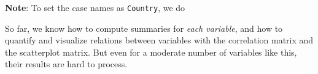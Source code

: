 \documentclass[]{book}
\newenvironment{Shaded}{\begin{snugshade}}{\end{snugshade}}
\newcommand{\KeywordTok}[1]{\textcolor[rgb]{0.13,0.29,0.53}{\textbf{#1}}}
\newcommand{\StringTok}[1]{\textcolor[rgb]{0.31,0.60,0.02}{#1}}
\newcommand{\OtherTok}[1]{\textcolor[rgb]{0.56,0.35,0.01}{#1}}
\newcommand{\OperatorTok}[1]{\textcolor[rgb]{0.81,0.36,0.00}{\textbf{#1}}}
\newcommand{\NormalTok}[1]{#1}
\begin{document}
\textbf{Note}: To set the case names as \texttt{Country}, we do

\begin{Shaded}
\end{Shaded}

So far, we know how to compute summaries for \emph{each variable}, and
how to quantify and visualize relations between variables with the
correlation matrix and the scatterplot matrix. But even for a moderate
number of variables like this, their results are hard to process.
\end{document}
